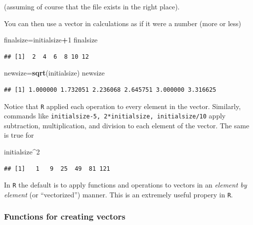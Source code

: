 \documentclass[11pt,]{article}
\newenvironment{Shaded}{\begin{snugshade}}{\end{snugshade}}
\newcommand{\DecValTok}[1]{\textcolor[rgb]{0.00,0.00,0.81}{#1}}
\newcommand{\KeywordTok}[1]{\textcolor[rgb]{0.13,0.29,0.53}{\textbf{#1}}}
\newcommand{\NormalTok}[1]{#1}
\newcommand{\OperatorTok}[1]{\textcolor[rgb]{0.81,0.36,0.00}{\textbf{#1}}}
\begin{document}
(assuming of course that the file exists in the right place).

You can then use a vector in calculations as if it were a number (more or less)

\begin{Shaded}
\begin{Highlighting}[]
\NormalTok{finalsize=initialsize}\OperatorTok{+}\DecValTok{1}
\NormalTok{finalsize}
\end{Highlighting}
\end{Shaded}

\begin{verbatim}
## [1]  2  4  6  8 10 12
\end{verbatim}

\begin{Shaded}
\begin{Highlighting}[]
\NormalTok{newsize=}\KeywordTok{sqrt}\NormalTok{(initialsize)}
\NormalTok{newsize}
\end{Highlighting}
\end{Shaded}

\begin{verbatim}
## [1] 1.000000 1.732051 2.236068 2.645751 3.000000 3.316625
\end{verbatim}

Notice that \texttt{R} applied each operation to every element in the vector. Similarly, commands like \texttt{initialsize-5,\ 2*initialsize,\ initialsize/10} apply subtraction, multiplication, and division to each element of the
vector. The same is true for

\begin{Shaded}
\begin{Highlighting}[]
\NormalTok{initialsize}\OperatorTok{^}\DecValTok{2}
\end{Highlighting}
\end{Shaded}

\begin{verbatim}
## [1]   1   9  25  49  81 121
\end{verbatim}

In \texttt{R} the default is to apply functions and operations to vectors in an \emph{element by element} (or ``vectorized'') manner. This is an extremely useful propery in \texttt{R}.

\hypertarget{functions-for-creating-vectors}{%
\subsubsection{Functions for creating vectors}\label{functions-for-creating-vectors}}
\end{document}
